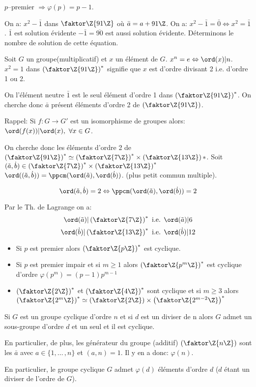 $p$--premier $\Rightarrow \varphi (p)=p-1$.

On a: $x^2-\bar 1$ dans $\faktor\Z{91\Z}$ où $\bar a=a+91\Z$. On a: $x^2-\bar 1 =\bar 0 \Leftrightarrow x^2=\bar 1$. $\bar 1$ est solution évidente $-\bar 1=\overline{90}$ est aussi solution évidente. Déterminons le nombre de solution de cette équation.

\begin{remark}
	Soit $G$ un groupe(multiplicatif) et $x$ un élément de $G$. $x^n=e\Leftrightarrow \ord(x)|n$. $x^2=1$ dans $\left(\faktor\Z{91\Z}\right)^\ast$ signifie que $x$ est d'ordre divisant 2 i.e. d'ordre 1 ou 2.
	
	On l'élément neutre $\bar 1$ est le seul élément d'ordre 1 dans $\left(\faktor\Z{91\Z}\right)^\ast$. On cherche donc $\bar a$ présent éléments d'ordre 2 de $\left(\faktor\Z{91\Z}\right)$. 
\end{remark}

Rappel: Si $f:G\rightarrow G'$ est un isomorphisme de groupes alors: $\ord(f(x))|\ord(x),\ \forall x\in G$.

On cherche donc les éléments d'ordre 2 de $\left(\faktor\Z{91\Z}\right)^\ast\simeq \left(\faktor\Z{7\Z}\right)^\ast\times \left(\faktor\Z{13\Z}\right)
\ast$. Soit $(\tilde a, \dot b)\in \left( \faktor\Z{7\Z} \right)^\ast \times \left( \faktor\Z{13\Z} \right)^\ast$ $\ord((\tilde a,\dot b))=\ppcm(\ord(\tilde a),\ord(\dot b))$. (plus petit commun multiple).

$$\ord(\tilde a, \dot b)=2\Leftrightarrow \ppcm(\ord(\tilde a),\ord(\dot b))=2$$

Par le Th. de Lagrange on a:
$$ \ord(\tilde a)|\left(\faktor\Z{7\Z}\right)^\ast\mbox{ i.e. } \ord(\tilde a)|6$$
$$\ord(\dot b) | \left(\faktor\Z{13\Z}\right)^\ast \mbox{ i.e. } \ord(\dot b) | 12$$

\begin{rappel}
	\begin{itemize}
		\item Si $p$ est premier alors $\left(\faktor\Z{p\Z}\right)^\ast$ est cyclique.
		\item Si $p$ est  premier impair et si $m\geq 1$ alors $\left(\faktor\Z{p^m\Z}\right)^\ast$ est cyclique d'ordre $\varphi (p^m)=(p-1)p^{m-1}$
		\item $\left(\faktor\Z{2\Z}\right)^\ast$ et $\left(\faktor\Z{4\Z}\right)^\ast$ sont cyclique et si $m\geq 3$ alors $\left(\faktor\Z{2^m\Z}\right)^\ast\simeq\left(\faktor\Z{2\Z}\right)\times \left(\faktor\Z{2^{m-2}\Z}\right)^\ast$
	\end{itemize}
	Si $G$ est un groupe cyclique d'ordre $n$ et si $d$ est un diviser de n alors $G$ admet un sous-groupe d'ordre $d$ et un seul et il est cyclique.
	
	En particulier, de plus, les générateur du groupe (additif) $\left(\faktor\Z{n\Z}\right)$ sont les $\bar a$ avec $a\in\{1,...\,,n\}$ et $(a,n)=1$. Il y en a donc: $\varphi (n)$.
	
	En particulier, le groupe cyclique $G$ admet $\varphi (d)$ éléments d'ordre $d$ ($d$ étant un diviser de l'ordre de $G$).
\end{rappel}

